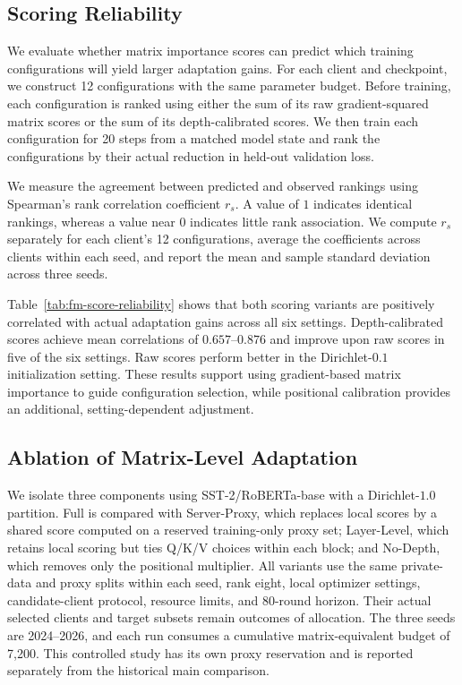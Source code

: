 \documentclass[10pt,conference,letterpaper]{IEEEtran}
\begin{document}
\subsection{Scoring Reliability}\label{sec:fm-score-study}
We evaluate whether matrix importance scores can predict which training configurations will yield larger adaptation gains. For each client and checkpoint, we construct 12 configurations with the same parameter budget. Before training, each configuration is ranked using either the sum of its raw gradient-squared matrix scores or the sum of its depth-calibrated scores. We then train each configuration for 20 steps from a matched model state and rank the configurations by their actual reduction in held-out validation loss.

We measure the agreement between predicted and observed rankings using Spearman's rank correlation coefficient $r_s$. A value of $1$ indicates identical rankings, whereas a value near $0$ indicates little rank association. We compute $r_s$ separately for each client's 12 configurations, average the coefficients across clients within each seed, and report the mean and sample standard deviation across three seeds.



Table~\ref{tab:fm-score-reliability} shows that both scoring variants are positively correlated with actual adaptation gains across all six settings. Depth-calibrated scores achieve mean correlations of $0.657$--$0.876$ and improve upon raw scores in five of the six settings. Raw scores perform better in the Dirichlet-$0.1$ initialization setting. These results support using gradient-based matrix importance to guide configuration selection, while positional calibration provides an additional, setting-dependent adjustment.

\subsection{Ablation of Matrix-Level Adaptation}\label{sec:fm-ablations}
We isolate three components using SST-2/RoBERTa-base with a Dirichlet-$1.0$ partition. Full is compared with Server-Proxy, which replaces local scores by a shared score computed on a reserved training-only proxy set; Layer-Level, which retains local scoring but ties Q/K/V choices within each block; and No-Depth, which removes only the positional multiplier. All variants use the same private-data and proxy splits within each seed, rank eight, local optimizer settings, candidate-client protocol, resource limits, and 80-round horizon. Their actual selected clients and target subsets remain outcomes of allocation. The three seeds are 2024--2026, and each run consumes a cumulative matrix-equivalent budget of 7,200. This controlled study has its own proxy reservation and is reported separately from the historical main comparison.
\end{document}
